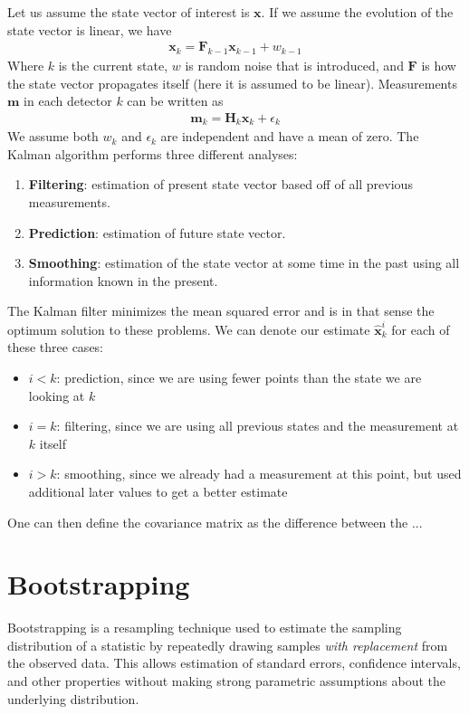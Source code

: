 Let us assume the state vector of interest is $\textbf{x}$. If we assume the evolution of the state vector is linear, we have
\begin{align}
    \textbf{x}_k = \textbf{F}_{k-1}\textbf{x}_{k-1} + w_{k-1}
\end{align}
Where $k$ is the current state, $w$ is random noise that is introduced, and $\textbf{F}$ is how the state vector propagates itself (here it is assumed to be linear). Measurements $\textbf{m}$ in each detector $k$ can be written as
\begin{align}
    \textbf{m}_k = \textbf{H}_k\textbf{x}_k + \epsilon_k
\end{align}
We assume both $w_k$ and $\epsilon_k$ are independent and have a mean of zero. The Kalman algorithm performs three different analyses:
\begin{enumerate}
    \item \textbf{Filtering}: estimation of present state vector based off of all previous measurements.
    \item \textbf{Prediction}: estimation of future state vector.
    \item \textbf{Smoothing}: estimation of the state vector at some time in the past using all information known in the present.
\end{enumerate}
The Kalman filter minimizes the mean squared error and is in that sense the optimum solution to these problems. We can denote our estimate $\hat{\textbf{x}}_k^i$ for each of these three cases:
\begin{itemize}
    \item $i < k$: prediction, since we are using fewer points than the state we are looking at $k$
    \item $i=k$: filtering, since we are using all previous states and the measurement at $k$ itself
    \item $i > k$: smoothing, since we already had a measurement at this point, but used additional later values to get a better estimate
\end{itemize}
One can then define the covariance matrix as the difference between the ...



\section{Bootstrapping}
Bootstrapping is a resampling technique used to estimate the sampling distribution of a statistic by repeatedly drawing samples \emph{with replacement} from the observed data. This allows estimation of standard errors, confidence intervals, and other properties without making strong parametric assumptions about the underlying distribution.

